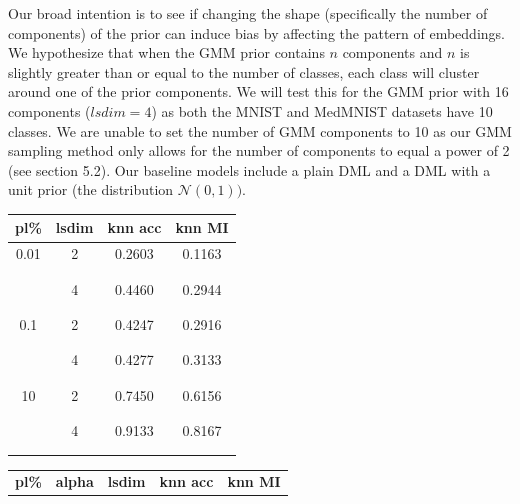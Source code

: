 \documentclass[./dissertation.tex]{subfiles}
\begin{document}
    Our broad intention is to see if changing the shape (specifically the number of components) of the prior can induce bias by affecting the pattern of embeddings. We hypothesize that when the GMM prior contains $n$ components and $n$ is slightly greater than or equal to the number of classes, each class will cluster around one of the prior components. We will test this for the GMM prior with 16 components ($lsdim = 4$) as both the MNIST and MedMNIST datasets have 10 classes. We are unable to set the number of GMM components to 10 as our GMM sampling method only allows for the number of components to equal a power of 2 (see section 5.2). Our baseline models include a plain DML and a DML with a unit prior (the distribution $\mathcal{N}(0, 1))$. \\
       \begin{table}[]
       \centering
       \small
       \begin{tabular}{|c|c|c|c|}
            \hline
            \textbf{pl\%} & \textbf{lsdim} & \textbf{knn acc} & \textbf{knn MI}  \\
            \hline
            0.01 & 2 & 0.2603 & 0.1163 \\
            & & & \\ 
            & & & \\
            & 4 & 0.4460 & 0.2944  \\ 
            & & & \\ 
            & & & \\
            0.1 & 2 & 0.4247 & 0.2916 \\
            & & & \\ 
            & & & \\
            & 4 & 0.4277 & 0.3133  \\ 
            & & & \\ 
            & & & \\
            10 & 2 & 0.7450 & 0.6156 \\
            & & & \\ 
            & & & \\
            & 4 & 0.9133 & 0.8167  \\ 
            & & & \\ 
            & & & \\
            \hline
            \hline
       \end{tabular}
        \begin{tabular}{|c|c|c|c|c|}
            \hline
            \textbf{pl\%} & \textbf{alpha} & \textbf{lsdim} & \textbf{knn acc} & \textbf{knn MI}  \\

\end{tabular}
\end{table}
\end{document}
